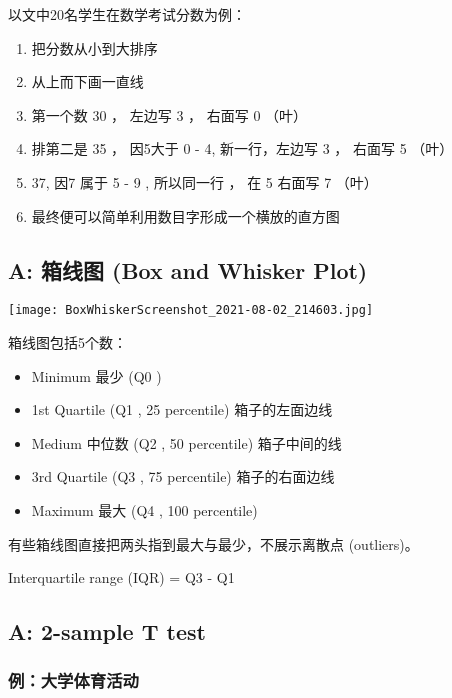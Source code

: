 以文中20名学生在数学考试分数为例：

\begin{enumerate}
\tightlist
\item
  把分数从小到大排序
\item
  从上而下画一直线
\item
  第一个数 30 ， 左边写 3 ， 右面写 0 （叶）
\item
  排第二是 35 ， 因5大于 0 - 4, 新一行，左边写 3 ， 右面写 5 （叶）
\item
  37, 因7 属于 5 - 9 , 所以同一行 ， 在 5 右面写 7 （叶）
\item
  最终便可以简单利用数目字形成一个横放的直方图
\end{enumerate}

\hypertarget{a-ux7bb1ux7ebfux56fe-box-and-whisker-plot}{%
\subsection{A: 箱线图 (Box and Whisker
Plot)}\label{a-ux7bb1ux7ebfux56fe-box-and-whisker-plot}}


\texttt{[image: BoxWhiskerScreenshot\_2021-08-02\_214603.jpg]}

箱线图包括5个数：

\begin{itemize}
\tightlist
\item
  Minimum 最少 (Q0 )
\item
  1st Quartile (Q1 , 25 percentile) 箱子的左面边线
\item
  Medium 中位数 (Q2 , 50 percentile) 箱子中间的线
\item
  3rd Quartile (Q3 , 75 percentile) 箱子的右面边线
\item
  Maximum 最大 (Q4 , 100 percentile)
\end{itemize}

有些箱线图直接把两头指到最大与最少，不展示离散点 (outliers)。

Interquartile range (IQR) = Q3 - Q1

\hypertarget{a-2-sample-t-test}{%
\subsection{A: 2-sample T test}\label{a-2-sample-t-test}}

\hypertarget{ux4f8bux5927ux5b66ux4f53ux80b2ux6d3bux52a8}{%
\subsubsection{例：大学体育活动}\label{ux4f8bux5927ux5b66ux4f53ux80b2ux6d3bux52a8}}

